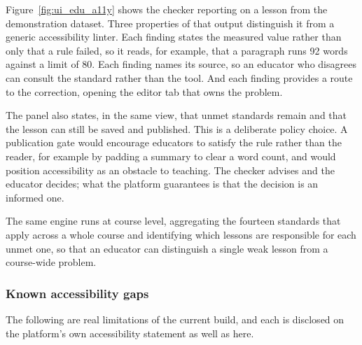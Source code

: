 \documentclass[12pt, oneside]{article} %
\begin{document}
Figure~\ref{fig:ui_edu_a11y} shows the checker reporting on a lesson from the demonstration dataset. Three properties of that output distinguish it from a generic accessibility linter. Each finding states the measured value rather than only that a rule failed, so it reads, for example, that a paragraph runs 92 words against a limit of 80. Each finding names its source, so an educator who disagrees can consult the standard rather than the tool. And each finding provides a route to the correction, opening the editor tab that owns the problem.

The panel also states, in the same view, that unmet standards remain and that the lesson can still be saved and published. This is a deliberate policy choice. A publication gate would encourage educators to satisfy the rule rather than the reader, for example by padding a summary to clear a word count, and would position accessibility as an obstacle to teaching. The checker advises and the educator decides; what the platform guarantees is that the decision is an informed one.

The same engine runs at course level, aggregating the fourteen standards that apply across a whole course and identifying which lessons are responsible for each unmet one, so that an educator can distinguish a single weak lesson from a course-wide problem.

\subsubsection{Known accessibility gaps}
\label{sec:a11y-gaps}

The following are real limitations of the current build, and each is disclosed on the platform's own accessibility statement as well as here.
\end{document}
